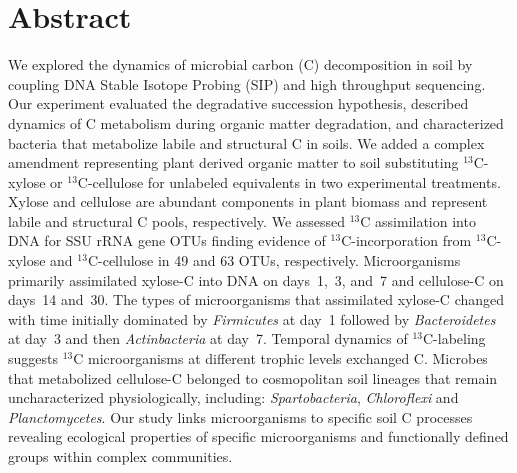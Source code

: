\section{Abstract} We explored the dynamics of microbial carbon (C)
decomposition in soil by coupling DNA Stable Isotope Probing (SIP) and high
throughput sequencing. Our experiment evaluated the degradative succession
hypothesis, described dynamics of C metabolism during organic matter
degradation, and characterized bacteria that metabolize labile and
structural C in soils. We added a complex amendment representing plant
derived organic matter to soil substituting $^{13}$C-xylose
or $^{13}$C-cellulose for unlabeled equivalents in two experimental
treatments. Xylose and cellulose are abundant components in plant biomass
and represent labile and structural C pools, respectively. We assessed
$^{13}$C assimilation into DNA for SSU rRNA gene OTUs finding evidence of
$^{13}$C-incorporation from $^{13}$C-xylose and $^{13}$C-cellulose in 49
and 63 OTUs, respectively. Microorganisms primarily assimilated xylose-C
into DNA on days~1,~3, and~7 and cellulose-C on days~14 and~30. The types
of microorganisms that assimilated xylose-C changed with time initially
dominated by \textit{Firmicutes} at day~1 followed by
\textit{Bacteroidetes} at day~3 and then \textit{Actinbacteria} at day~7.
Temporal dynamics of $^{13}$C-labeling suggests $^{13}$C microorganisms at
different trophic levels exchanged C. Microbes that metabolized
cellulose-C belonged to cosmopolitan soil lineages that remain
uncharacterized physiologically, including: \textit{Spartobacteria},
\textit{Chloroflexi} and \textit{Planctomycetes}. Our study links
microorganisms to specific soil C processes revealing ecological properties of
specific microorganisms and functionally defined groups within complex
communities.
